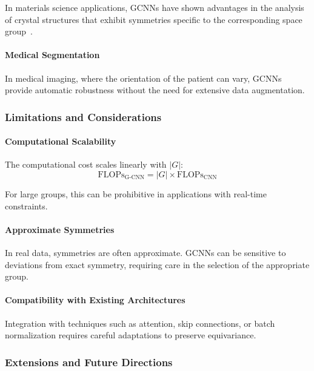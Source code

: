 In materials science applications, \glspl{GCNN} have shown advantages in the analysis of crystal structures that exhibit symmetries specific to the corresponding space group~\citep{weiler2018learningsteerable}.

\paragraph{Medical Segmentation}

In medical imaging, where the orientation of the patient can vary, \glspl{GCNN} provide automatic robustness without the need for extensive data augmentation.

\subsubsection{Limitations and Considerations}

\paragraph{Computational Scalability}

The computational cost scales linearly with $|G|$:
\begin{equation}
\text{FLOPs}_{\text{G-CNN}} = |G| \times \text{FLOPs}_{\text{CNN}}
\end{equation}

For large groups, this can be prohibitive in applications with real-time constraints.

\paragraph{Approximate Symmetries}

In real data, symmetries are often approximate. \glspl{GCNN} can be sensitive to deviations from exact symmetry, requiring care in the selection of the appropriate group.

\paragraph{Compatibility with Existing Architectures}

Integration with techniques such as attention, skip connections, or batch normalization requires careful adaptations to preserve equivariance.

\subsubsection{Extensions and Future Directions}

